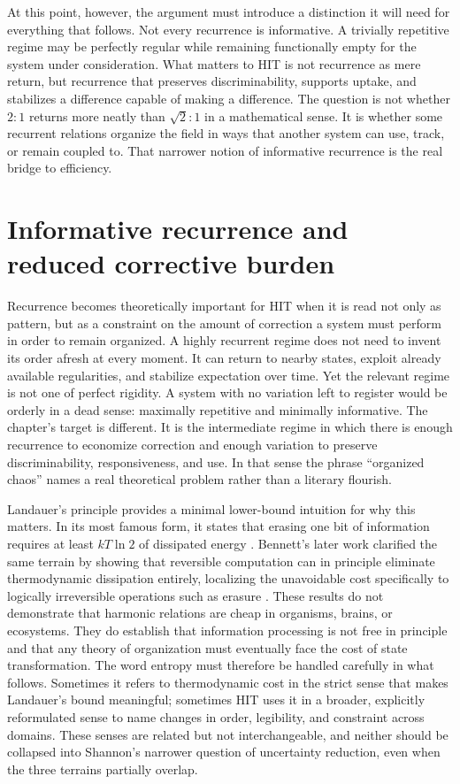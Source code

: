 At this point, however, the argument must introduce a distinction it will need for everything that follows. Not every recurrence is informative. A trivially repetitive regime may be perfectly regular while remaining functionally empty for the system under consideration. What matters to HIT is not recurrence as mere return, but recurrence that preserves discriminability, supports uptake, and stabilizes a difference capable of making a difference. The question is not whether $2{:}1$ returns more neatly than $\sqrt{2}{:}1$ in a mathematical sense. It is whether some recurrent relations organize the field in ways that another system can use, track, or remain coupled to. That narrower notion of informative recurrence is the real bridge to efficiency.

\section{Informative recurrence and reduced corrective burden}

Recurrence becomes theoretically important for HIT when it is read not only as pattern, but as a constraint on the amount of correction a system must perform in order to remain organized. A highly recurrent regime does not need to invent its order afresh at every moment. It can return to nearby states, exploit already available regularities, and stabilize expectation over time. Yet the relevant regime is not one of perfect rigidity. A system with no variation left to register would be orderly in a dead sense: maximally repetitive and minimally informative. The chapter's target is different. It is the intermediate regime in which there is enough recurrence to economize correction and enough variation to preserve discriminability, responsiveness, and use. In that sense the phrase \enquote{organized chaos} names a real theoretical problem rather than a literary flourish.

Landauer's principle provides a minimal lower-bound intuition for why this matters. In its most famous form, it states that erasing one bit of information requires at least $kT \ln 2$ of dissipated energy \parencite{landauer_1961}. Bennett's later work clarified the same terrain by showing that reversible computation can in principle eliminate thermodynamic dissipation entirely, localizing the unavoidable cost specifically to logically irreversible operations such as erasure \parencite{bennett_1982}. These results do not demonstrate that harmonic relations are cheap in organisms, brains, or ecosystems. They do establish that information processing is not free in principle and that any theory of organization must eventually face the cost of state transformation. The word entropy must therefore be handled carefully in what follows. Sometimes it refers to thermodynamic cost in the strict sense that makes Landauer's bound meaningful; sometimes HIT uses it in a broader, explicitly reformulated sense to name changes in order, legibility, and constraint across domains. These senses are related but not interchangeable, and neither should be collapsed into Shannon's narrower question of uncertainty reduction, even when the three terrains partially overlap.

